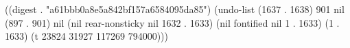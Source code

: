 
((digest . "a61bbb0a8e5a842bf157a6584095da85") (undo-list (1637 . 1638) 901 nil (897 . 901) nil (nil rear-nonsticky nil 1632 . 1633) (nil fontified nil 1 . 1633) (1 . 1633) (t 23824 31927 117269 794000)))
